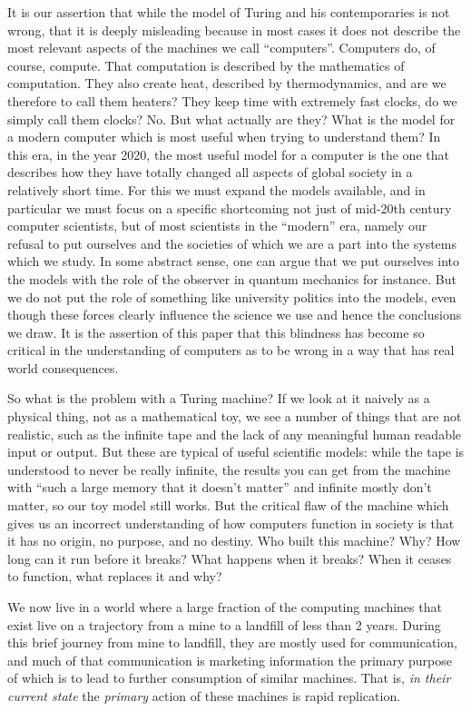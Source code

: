 \documentclass[12pt,a4paper]{amsart}
\numberwithin{equation}{section}
\begin{document}
It is our assertion that while the model of Turing and his
contemporaries is not wrong, that it is deeply misleading because in
most cases it does not describe the most relevant aspects of the
machines we call ``computers''. Computers do, of course, compute. That
computation is described by the mathematics of computation. They also
create heat, described by thermodynamics, and are we therefore to call
them heaters? They keep time with extremely fast clocks, do we simply
call them clocks? No. But what actually are they? What is the model for
a modern computer which is most useful when trying to understand them?
In this era, in the year 2020, the most useful model for a computer is
the one that describes how they have totally changed all aspects of
global society in a relatively short time. For this we must expand the
models available, and in particular we must focus on a specific
shortcoming not just of mid-20th century computer scientists, but of
most scientists in the ``modern'' era, namely our refusal to put
ourselves and the societies of which we are a part into the systems
which we study. In some abstract sense, one can argue that we put
ourselves into the models with the role of the observer in quantum
mechanics for instance. But we do not put the role of something like
university politics into the models, even though these forces clearly
influence the science we use and hence the conclusions we draw. It is
the assertion of this paper that this blindness has become so critical
in the understanding of computers as to be wrong in a way that has real
world consequences.

So what is the problem with a Turing machine? If we look at it naively
as a physical thing, not as a mathematical toy, we see a number of
things that are not realistic, such as the infinite tape and the lack of
any meaningful human readable input or output. But these are typical of
useful scientific models: while the tape is understood to never be
really infinite, the results you can get from the machine with ``such a
large memory that it doesn't matter'' and infinite mostly don't matter,
so our toy model still works. But the critical flaw of the machine which
gives us an incorrect understanding of how computers function in society
is that it has no origin, no purpose, and no destiny. Who built this
machine? Why? How long can it run before it breaks? What happens when it
breaks? When it ceases to function, what replaces it and why?

We now live in a world where a large fraction of the computing machines
that exist live on a trajectory from a mine to a landfill of less than 2
years. During this brief journey from mine to landfill, they are mostly
used for communication, and much of that communication is marketing
information the primary purpose of which is to lead to further
consumption of similar machines. That is, \emph{in their current state}
the \emph{primary} action of these machines is rapid replication.
\end{document}

